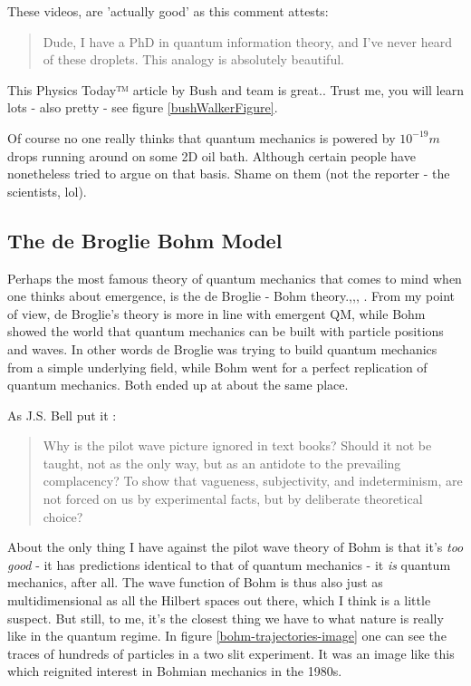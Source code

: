 \documentclass[../rzero]{subfiles}
\begin{document}
These videos, are 'actually good'\cite{theonionYouTubeContestChallenges2008} as this comment attests:
\begin{quotation}
	Dude, I have a PhD in quantum information theory, and I've never heard of these droplets. This analogy is absolutely beautiful. 
\end{quotation}
 
This Physics Today™ article by Bush and team is great.\cite{Bush2015a}. Trust me, you will learn lots - also pretty - see figure \ref{bushWalkerFigure}.


Of course no one really thinks that quantum mechanics is powered by $10^{-19}m$ drops running around on some 2D oil bath. Although certain people have nonetheless tried to argue on that basis. Shame on them (not the reporter - the scientists, lol).\cite{wolchoverFamousExperimentDooms2018}


\subsection{The de Broglie Bohm Model}
Perhaps the most famous theory of quantum mechanics that comes to mind when one thinks about emergence, is the de Broglie - Bohm theory.\cite{Bohm1952},\cite{broglieMecaniqueOndulatoireStructure1927},\cite{Tumulka2017}, \cite{Bohm1982}. From my point of view, de Broglie's theory is more in line with emergent QM, while Bohm showed the world that quantum mechanics can be built with particle positions and waves. In other words de Broglie was trying to build quantum mechanics from a simple underlying field, while Bohm went for a perfect replication of quantum mechanics. Both ended up at about the same place.

As J.S. Bell put it \cite{Bell1982}:
\begin{quotation}
Why is the pilot wave picture ignored in text books? Should it not be taught, not as the only way, but as an antidote to the prevailing complacency? To show that vagueness, subjectivity, and indeterminism, are not forced on us by experimental facts, but by deliberate theoretical choice?
\end{quotation}

About the only thing I have against the pilot wave theory of Bohm is that it's \textit{too good} - it has predictions identical to that of quantum mechanics - it \textit{is} quantum mechanics, after all. The wave function of Bohm is thus also just as multidimensional as all the Hilbert spaces out there, which I think is a little suspect. But still, to me, it's the closest thing we have to what nature is really like in the quantum regime. In figure \ref{bohm-trajectories-image} one can see the traces of hundreds of particles in a two slit experiment. It was an image like this which reignited interest in Bohmian mechanics in the 1980s.  
\end{document}
